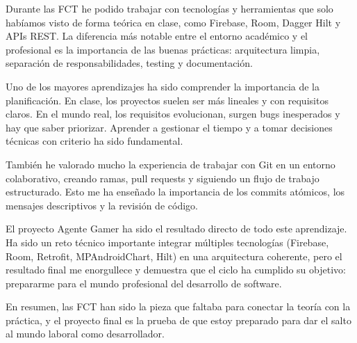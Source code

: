 \documentclass[
  spanish,
  11pt,
  paper=a4,
  ,captions=tableheading
]{scrartcl}
\begin{document}
Durante las FCT he podido trabajar con tecnologías y herramientas que
solo habíamos visto de forma teórica en clase, como Firebase, Room,
Dagger Hilt y APIs REST. La diferencia más notable entre el entorno
académico y el profesional es la importancia de las buenas prácticas:
arquitectura limpia, separación de responsabilidades, testing y
documentación.

Uno de los mayores aprendizajes ha sido comprender la importancia de la
planificación. En clase, los proyectos suelen ser más lineales y con
requisitos claros. En el mundo real, los requisitos evolucionan, surgen
bugs inesperados y hay que saber priorizar. Aprender a gestionar el
tiempo y a tomar decisiones técnicas con criterio ha sido fundamental.

También he valorado mucho la experiencia de trabajar con Git en un
entorno colaborativo, creando ramas, pull requests y siguiendo un flujo
de trabajo estructurado. Esto me ha enseñado la importancia de los
commits atómicos, los mensajes descriptivos y la revisión de código.

El proyecto Agente Gamer ha sido el resultado directo de todo este
aprendizaje. Ha sido un reto técnico importante integrar múltiples
tecnologías (Firebase, Room, Retrofit, MPAndroidChart, Hilt) en una
arquitectura coherente, pero el resultado final me enorgullece y
demuestra que el ciclo ha cumplido su objetivo: prepararme para el mundo
profesional del desarrollo de software.

En resumen, las FCT han sido la pieza que faltaba para conectar la
teoría con la práctica, y el proyecto final es la prueba de que estoy
preparado para dar el salto al mundo laboral como desarrollador.
\end{document}
